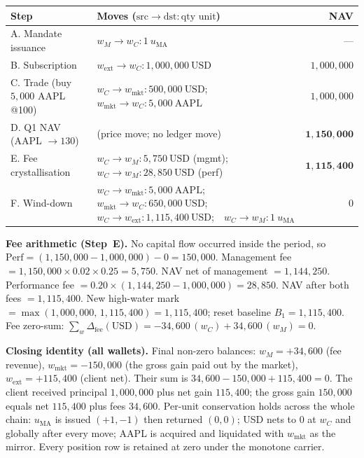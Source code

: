 \documentclass[11pt,a4paper]{article}
\begin{document}
\begin{longtable}{p{4.6cm}p{7.2cm}r}
\toprule
\textbf{Step} & \textbf{Moves} ($\text{src}\to\text{dst}:\text{qty unit}$) & \textbf{NAV} \\
\midrule
A. Mandate issuance & $w_M\to w_C:1\ u_{\mathrm{MA}}$ & --- \\
B. Subscription & $w_{\text{ext}}\to w_C:1{,}000{,}000\ \text{USD}$ & $1{,}000{,}000$ \\
C. Trade (buy $5{,}000$ AAPL @100) & $w_C\to w_{\text{mkt}}:500{,}000\ \text{USD}$;\ \ $w_{\text{mkt}}\to w_C:5{,}000\ \text{AAPL}$ & $1{,}000{,}000$ \\
D. Q1 NAV (AAPL $\to 130$) & (price move; no ledger move) & $\mathbf{1{,}150{,}000}$ \\
E. Fee crystallisation & $w_C\to w_M:5{,}750\ \text{USD}$ (mgmt);\ \ $w_C\to w_M:28{,}850\ \text{USD}$ (perf) & $\mathbf{1{,}115{,}400}$ \\
F. Wind-down & $w_C\to w_{\text{mkt}}:5{,}000\ \text{AAPL}$;\ \ $w_{\text{mkt}}\to w_C:650{,}000\ \text{USD}$;\ \ $w_C\to w_{\text{ext}}:1{,}115{,}400\ \text{USD}$;\ \ $w_C\to w_M:1\ u_{\mathrm{MA}}$ & $0$ \\
\bottomrule
\end{longtable}

\noindent\textbf{Fee arithmetic (Step~E).} No capital flow occurred inside the period, so
$\mathrm{Perf}=(1{,}150{,}000-1{,}000{,}000)-0=150{,}000$. Management fee
$=1{,}150{,}000\times0.02\times0.25=5{,}750$. NAV net of management
$=1{,}144{,}250$. Performance fee $=0.20\times(1{,}144{,}250-1{,}000{,}000)=28{,}850$. NAV after
both fees $=1{,}115{,}400$. New high-water mark $=\max(1{,}000{,}000,\,1{,}115{,}400)=1{,}115{,}400$;
reset baseline $B_1=1{,}115{,}400$. Fee zero-sum:
$\sum_w\Delta_{\text{fee}}(\text{USD})=-34{,}600\,(w_C)+34{,}600\,(w_M)=0$.

\noindent\textbf{Closing identity (all wallets).} Final non-zero balances:
$w_M=+34{,}600$ (fee revenue), $w_{\text{mkt}}=-150{,}000$ (the gross gain paid out by the
market), $w_{\text{ext}}=+115{,}400$ (client net). Their sum is
$34{,}600-150{,}000+115{,}400=0$. The client received principal $1{,}000{,}000$ plus net gain
$115{,}400$; the gross gain $150{,}000$ equals net $115{,}400$ plus fees $34{,}600$. Per-unit
conservation holds across the whole chain: $u_{\mathrm{MA}}$ is issued $(+1,-1)$ then returned
$(0,0)$; USD nets to $0$ at $w_C$ and globally after every move; AAPL is acquired and liquidated
with $w_{\text{mkt}}$ as the mirror. Every position row is retained at zero under the monotone
carrier.
\end{document}
